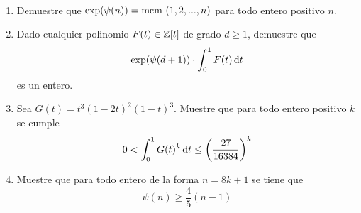 \begin{prob}[2 pts. c/u]
	\
	\begin{enumerate}[label = \roman*]
		\item Demuestre que $\exp(\psi(n))=\text{mcm }(1,2,...,n)$ para todo entero positivo $n$.

		\item Dado cualquier polinomio $F(t)\in\mathbb{Z}[t]$ de grado $d\geq 1$, demuestre que
		      \[\exp(\psi(d+1))\cdot\int^1_0F(t)\operatorname{d}\!{t}\]
		      es un entero.

		\item Sea $G(t)=t^3(1-2t)^2(1-t)^3$. Muestre que para todo entero positivo $k$ se cumple
		      \[0<\int^1_0G(t)^k\operatorname{d}\!{t}\leq\left(\frac{27}{16384}\right)^k\]

		\item Muestre que para todo entero de la forma $n=8k+1$ se tiene que
		      \[\psi(n)\geq\frac{4}{5}(n-1)\]
	\end{enumerate}
\end{prob}

